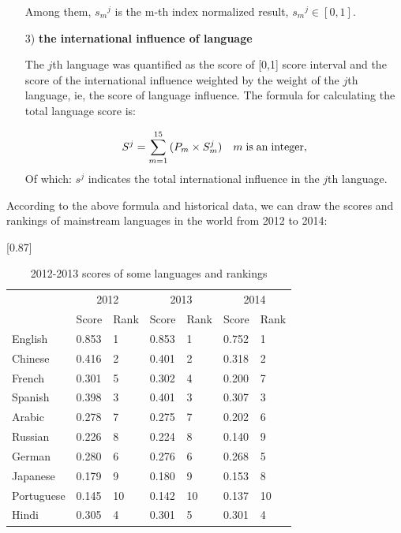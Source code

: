 \begin{enumerate}
	\par Among them, ${s_m}^j$ is the m-th index normalized result, ${s_m}^j \in [0,1]$.
	
	\item[3)] \textbf{the international influence of language}
	\par The $j$th language was quantified as the score of [0,1] score interval and the score  of the international influence weighted by the weight of the $j$th language, ie, the score of language influence. The formula for calculating the total language score is:
	 
	 \begin{equation}
	 {S^j} = \sum\limits_{m = 1}^{15} {({P_m} \times S_m^j)} {\rm{       }}\quad m\;{\rm{ is\; an\; integer}} \label{aa1},
	 \end{equation}
	 \noindent Of which: ${s^j}$ indicates the total international influence in the $j$th language.
	
\end{enumerate}

\par According to the above formula and historical data, we can draw the scores and rankings of mainstream languages in the world from 2012 to 2014:


\begin{table}[H]
	\centering
	\caption{2012-2013 scores of some languages and rankings}
	 \scalebox{0.87}[0.87]{%
	\begin{tabular}{p{4.11em}p{4.11em}p{4.11em}p{4.11em}p{4.11em}p{4.11em}p{4.11em}}
		\toprule
		\multicolumn{1}{r}{\multirow{2}[4]{*}{\backslashbox[0pt][c]{Language}{Time}}} & \multicolumn{2}{c}{2012} & \multicolumn{2}{c}{2013} & \multicolumn{2}{c}{2014} \\
		\cmidrule{2-7}    \multicolumn{1}{c}{} & Score & Rank & Score& Rank & Score & Rank\\
    \midrule
	English & 0.853  & 1     & 0.853  & 1     & 0.752  & 1 \\
	\midrule
	Chinese & 0.416  & 2     & 0.401  & 2     & 0.318  & 2 \\
	\midrule
	French & 0.301  & 5     & 0.302  & 4     & 0.200  & 7 \\
	\midrule
	Spanish & 0.398  & 3     & 0.401  & 3     & 0.307  & 3 \\
	\midrule
	Arabic & 0.278  & 7     & 0.275  & 7     & 0.202  & 6 \\
	\midrule
	Russian & 0.226  & 8     & 0.224  & 8     & 0.140  & 9 \\
	\midrule
	German & 0.280  & 6     & 0.276  & 6     & 0.268  & 5 \\
	\midrule
	Japanese & 0.179  & 9     & 0.180  & 9     & 0.153  & 8 \\
	\midrule
	Portuguese & 0.145  & 10    & 0.142  & 10    & 0.137  & 10 \\
	\midrule
	Hindi & 0.305  & 4     & 0.301  & 5     & 0.301  & 4 \\
	\bottomrule
	\end{tabular}%
}
	\label{tab:012}%
\end{table}%

